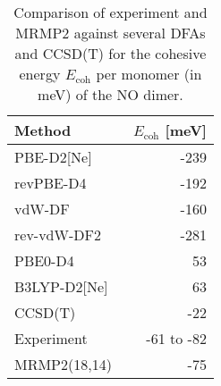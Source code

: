 \begin{table}
\caption{\label{tab:dimer_ecoh}Comparison of experiment and MRMP2 against several DFAs and CCSD(T) for the cohesive energy $E_\text{coh}$ per monomer (in meV) of the NO dimer.}
\begin{adjustbox}{center}
\begin{tabular}{lr}
\toprule
Method & $E_\text{coh}$ [meV] \\ 
\midrule
PBE-D2[Ne] & -239 \\
revPBE-D4 & -192 \\
vdW-DF & -160 \\
rev-vdW-DF2 & -281 \\
PBE0-D4 & 53 \\
B3LYP-D2[Ne] & 63 \\
CCSD(T)~\cite{tobitaCriticalComparisonSinglereference2003} & -22 \\
Experiment~\cite{ivanicHighlevelTheoreticalStudy2012a} & -61 to -82 \\
MRMP2(18,14)~\cite{ivanicHighlevelTheoreticalStudy2012a} & -75 \\
\bottomrule
\end{tabular}
\end{adjustbox}
\end{table}